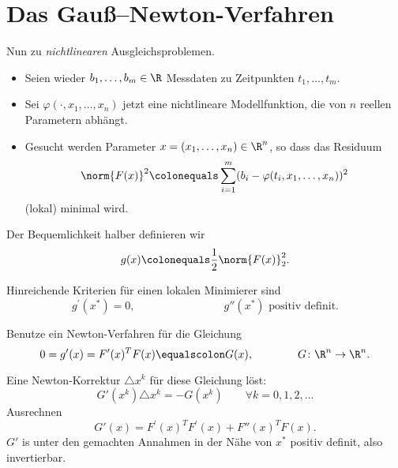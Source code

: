 \section{Das Gauß--Newton-Verfahren}

Nun zu \emph{nichtlinearen} Ausgleichsproblemen.
\begin{itemize}
 \item Seien wieder $b_1, \ldots, b_m \in \R$ Messdaten zu Zeitpunkten $t_1, \ldots, t_m$.

 \item Sei $\varphi ( \cdot,x_1,\ldots,x_n)$ jetzt eine nichtlineare Modellfunktion,
   die von $n$ reellen Parametern abhängt.

 \item Gesucht werden Parameter $x=(x_1,\ldots,x_n ) \in \R^n$, so dass das Residuum
 \begin{equation*}
  \norm{F(x)}^2 \colonequals \sum_{i=1}^m (b_i-\varphi (t_i, x_1,\ldots, x_n ) )^2
 \end{equation*}
 (lokal) minimal wird.
\end{itemize}

Der Bequemlichkeit halber definieren wir
\begin{equation*}
 g(x)\colonequals\frac{1}{2} \norm{F(x)}_2^2.
\end{equation*}

Hinreichende Kriterien für einen lokalen Minimierer sind
\begin{equation*}
 g^{\prime} (x^* )=0, \qquad \qquad \qquad \qquad \text{$g'' (x^*)$ positiv definit}.
\end{equation*}

\begin{idea}
Benutze ein Newton-Verfahren für die Gleichung
\begin{equation*}
 0=g^{\prime}(x)=F^{\prime}(x)^T F(x)\equalscolon  G(x), \qquad \qquad G \colon \R^n \to \R^n.
\end{equation*}
\end{idea}

Eine Newton-Korrektur $\triangle x^k$ für diese Gleichung löst:
\begin{equation*}
  G'(x^k ) \triangle x^k = -G (x^k ) \qquad \forall k=0,1,2, \ldots
\end{equation*}
Ausrechnen
\begin{equation*}
  G'(x) = F^{\prime}(x)^T F^{\prime}(x) + F''(x)^T F(x).
\end{equation*}
$G'$ is unter den gemachten Annahmen in der Nähe von $x^*$ positiv definit, also invertierbar.

